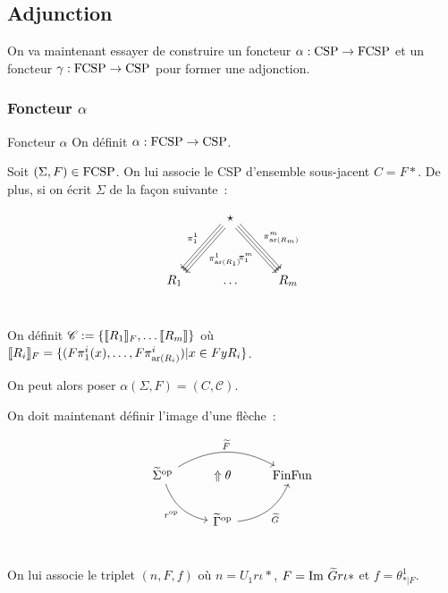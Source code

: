 \subsection{Adjunction}

On va maintenant essayer de construire un foncteur $\alpha : \text{CSP}\rightarrow\text{FCSP}$
et un foncteur $\gamma : \text{FCSP}\rightarrow\text{CSP}$ pour former une adjonction.

\subsubsection{Foncteur $\alpha$}

\begin{defi}{Foncteur $\alpha$}
    On définit $\alpha : \text{FCSP}\rightarrow\text{CSP}$.

    Soit $(\Sigma,F)\in\text{FCSP}$. On lui associe le CSP d'ensemble sous-jacent $C=F\ast$.
    De plus, si on écrit $\Sigma$ de la façon suivante~:

    \[\begin{tikzcd}
        & \star \arrow[ddl, shift right, swap, "\pi_1^1"]
                \arrow[ddl]
                \arrow[ddl, shift left, "\pi_{\text{ar}(R_1)}^1"]
                \arrow[ddr, shift right, swap, "\pi_1^m"]
                \arrow[ddr]
                \arrow[ddr, shift left, "\pi_{\text{ar}(R_m)}^m"]
                \\
        & & \\
        R_1 & \dots & R_m \\
    \end{tikzcd}\]

    On définit $\mathscr{C} := \{\llbracket {R_1} \rrbracket_F,\dots\llbracket {R_m} \rrbracket\}$ où
    $\llbracket {R_i} \rrbracket_F = \{(F\pi^i_1(x), \dots, F\pi^i_{\text{ar}(R_i)}) | x\in FyR_i\}$.

    On peut alors poser $\alpha(\Sigma,F) = (C,\mathscr{C})$.

    On doit maintenant définir l'image d'une flèche~:

    \[\begin{tikzcd}
        \tsigma^\op\arrow[dr, bend right, swap, "r^\op"]\arrow[rr, bend left, "\tf"]
            & \Uparrow\theta
            & \ffun \\
        & \tgamma^\op\arrow[ur, bend right, swap, "\tg"] \\
    \end{tikzcd}\]

    On lui associe le triplet $(n,F,f)$ où $n = U_1r\iota\ast$,
    $F = \text{Im } \widetilde{G} r\iota\ast$ et $f = \theta^1_{\ast|F}$.
\end{defi}

